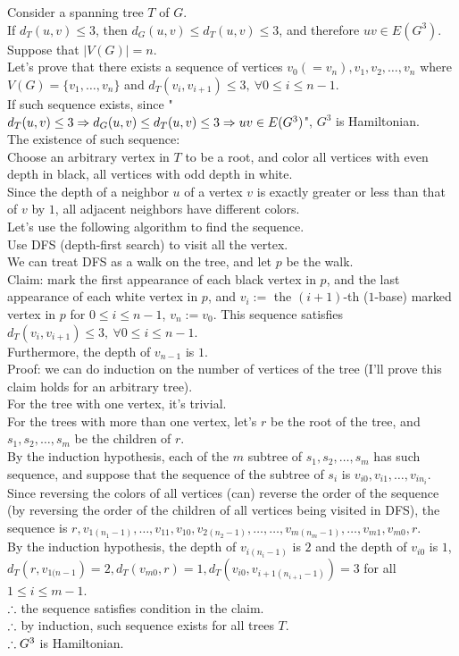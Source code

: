 \setcounter{pr}{5}
\begin{pr}
Consider a spanning tree $T$ of $G$.\\
If $d_T(u, v)\leq3$, then $d_G(u, v)\leq d_T(u, v)\leq3$, and therefore $uv\in E(G^3)$.\\
Suppose that $|V(G)|=n$.\\
Let's prove that there exists a sequence of vertices $v_0(=v_n), v_1, v_2, \dots, v_n$ where $V(G)=\{v_1, \dots, v_n\}$ and $d_T(v_i, v_{i+1})\leq3,\ \forall0\leq i\leq n-1$.\\
If such sequence exists, since "$d_T(u, v)\leq3\Rightarrow d_G(u, v)\leq d_T(u, v)\leq3\Rightarrow uv\in E(G^3)$", $G^3$ is Hamiltonian.\\
The existence of such sequence:\\
Choose an arbitrary vertex in $T$ to be a root, and color all vertices with even depth in black, all vertices with odd depth in white.\\
Since the depth of a neighbor $u$ of a vertex $v$ is exactly greater or less than that of $v$ by $1$, all adjacent neighbors have different colors.\\
Let's use the following algorithm to find the sequence.\\
Use DFS (depth-first search) to visit all the vertex.\\
We can treat DFS as a walk on the tree, and let $p$ be the walk.\\
Claim: mark the first appearance of each black vertex in $p$, and the last appearance of each white vertex in $p$, and $v_i:=$ the $(i+1)$-th ($1$-base) marked vertex in $p$ for $0\leq i\leq n-1$, $v_n:=v_0$. This sequence satisfies $d_T(v_i, v_{i+1})\leq3,\ \forall0\leq i\leq n-1$.\\ Furthermore, the depth of $v_{n-1}$ is $1$.\\
Proof: we can do induction on the number of vertices of the tree (I'll prove this claim holds for an arbitrary tree).\\
For the tree with one vertex, it's trivial.\\
For the trees with more than one vertex, let's $r$ be the root of the tree, and $s_1, s_2, \dots, s_m$ be the children of $r$.\\
By the induction hypothesis, each of the $m$ subtree of $s_1, s_2, \dots, s_m$ has such sequence, and suppose that the sequence of the subtree of $s_i$ is $v_{i0}, v_{i1}, \dots, v_{in_i}$.\\
Since reversing the colors of all vertices (can) reverse the order of the sequence (by reversing the order of the children of all vertices being visited in DFS), the sequence is $r, v_{1(n_1-1)}, \dots, v_{11}, v_{10}, v_{2(n_2-1)}, \dots, \dots, v_{m(n_m-1)}, \dots, v_{m1}, v_{m0}, r$.\\
By the induction hypothesis, the depth of $v_{i(n_i-1)}$ is $2$ and the depth of $v_{i0}$ is $1$, $d_T(r, v_{1(n-1})=2, d_T(v_{m0}, r)=1, d_T(v_{i0}, v_{{i+1}(n_{i+1}-1)})=3$ for all $1\leq i\leq m-1$.\\
$\therefore$ the sequence satisfies condition in the claim.\\
$\therefore$ by induction, such sequence exists for all trees $T$.\\
$\therefore G^3$ is Hamiltonian.
\end{pr}
